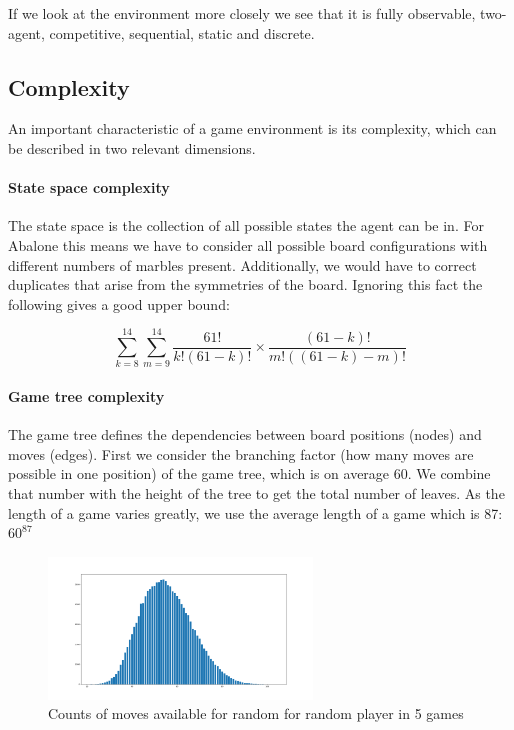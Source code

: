 \documentclass{llncs}
\begin{document}
If we look at the environment more closely we see that it is fully observable, two-agent, competitive, sequential, static and discrete.

\subsection{Complexity}
An important characteristic of a game environment is its complexity, which can be described in two relevant dimensions.

\paragraph{State space complexity}

The state space is the collection of all possible states the agent can be in.\cite[p. 150]{russell_artificial_2021} For Abalone this means we have to consider all possible board configurations with different numbers of marbles present. Additionally, we would have to correct duplicates that arise from the symmetries of the board. Ignoring this fact the following gives a good upper bound:

$$
	\sum_{k=8}^{14}\sum_{m=9}^{14}\frac{61!}{k!(61-k)!}\times\frac{(61-k)!}{m!((61-k)-m)!}
$$

\paragraph{Game tree complexity} The game tree defines the dependencies between board positions (nodes) and moves (edges). First we consider the branching factor (how many moves are possible in one position) of the game tree, which is on average 60. We combine that number with the height of the tree to get the total number of leaves. As the length of a game varies greatly, we use the average length of a game which is 87: $60^{87}$ \cite{lemmens_constructing_2005}

\begin{figure}
	\centering
	\includegraphics[width=7cm, keepaspectratio]{distribution_of_moves.png}
	\caption{Counts of moves available for random for random player in 5 games}
\end{figure}
\end{document}
